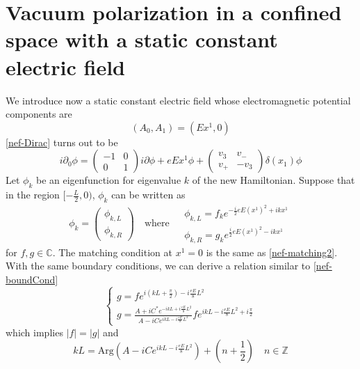 \section{Vacuum polarization in a confined space with a static constant electric field}\label{vacuum-sect-field}
We introduce now a static constant electric field whose electromagnetic potential components are 
\begin{equation*}
(A_0, A_1) = (E x^1, 0)
\end{equation*}
\cref{nef-Dirac} turns out to be
\begin{equation} 
i \partial_0 \phi = 
\begin{pmatrix} 
-1 & 0 \\
0 & 1 
\end{pmatrix} i \partial \phi + eEx^1 \phi +
\begin{pmatrix}
v_3 & v_- \\
v_+ & -v_3
\end{pmatrix} \delta(x_1) \phi
\end{equation}
Let $\phi_k$ be an eigenfunction for eigenvalue $k$ of the new Hamiltonian. 
Suppose that in the region $[-\frac{L}{2}, 0)$, 
$\phi_k$ can be written as 
\begin{equation}
\phi_k =\begin{pmatrix}
\phi_{k,L}  \\
\phi_{k,R}
\end{pmatrix} 
\quad \textrm{where $\begin{split} 
 & \phi_{k,L} = f_k e^{-\frac{i}{2}eE(x^1)^2 + ikx^1} \\
& \phi_{k,R} = g_k e^{\frac{i}{2}eE(x^1)^2 - ikx^1}
\end{split}
$}
\end{equation}
for $f, g\in \mathbb{C}$. 
The matching condition at $x^1 = 0$ is the same as \cref{nef-matching2}. 
With the same boundary conditions, we can derive a relation similar to \cref{nef-boundCond}
\begin{equation}
\begin{cases}
g = fe^{i(kL + \frac{\pi}{2}) - i\frac{eE}{8}L^2}  \\
g = \frac{A + iC^* e^{-ikL + i\frac{eE}{8}L^2 }}{A - iC e^{ikL - i\frac{eE}{8}L^2}} fe^{ikL - i\frac{eE}{8}L^2 + i\frac{\pi}{2}}
\end{cases}
\end{equation}
which implies $|f| = |g|$ and
\begin{equation}
kL = \textrm{Arg}(A - iC e^{ikL -i\frac{eE}{8}L^2}) + (n + \frac{1}{2}) \quad n\in \mathbb{Z}
\end{equation}
